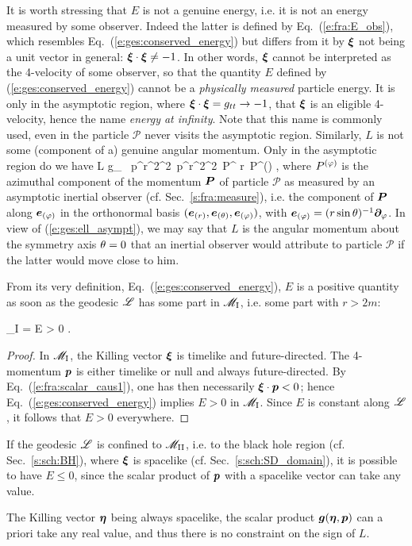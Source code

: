 It is worth stressing that $E$ is not a genuine energy, i.e. it is not
an energy measured by some observer. Indeed the latter is defined by
Eq.~(\ref{e:fra:E_obs}), which resembles Eq.~(\ref{e:ges:conserved_energy})
but differs from it by $\bm{\xi}$ not being a unit vector in general:
$\bm{\xi}\cdot\bm{\xi} \not = -1$. In other words, $\bm{\xi}$ cannot
be interpreted as the 4-velocity of some observer, so that the quantity
$E$ defined by (\ref{e:ges:conserved_energy}) cannot be a \emph{physically measured}
particle energy. It is only in the asymptotic region, where $\bm{\xi}\cdot\bm{\xi} = g_{tt}
\to -1$, that $\bm{\xi}$ is an eligible 4-velocity, hence the name
\emph{energy at infinity}. Note that this name is commonly used, even in the
particle $\mathscr{P}$ never visits the asymptotic region.
Similarly, $L$ is not some (component of a) genuine angular momentum. Only in the
asymptotic region do we have
\be \label{e:ges:ell_asympt}
    L \simeq g_{\ph\ph} \, p^\ph \simeq r^2\sin^2\ph \, p^\ph \simeq r^2\sin^2\theta \, P^\ph
    \simeq r\sin\th \, P^{(\ph)} ,
\ee
where $P^{(\varphi)}$ is the azimuthal component of the momentum $\bm{P}$ of particle $\mathscr{P}$
as measured by an asymptotic inertial observer (cf. Sec.~\ref{s:fra:measure}), i.e.
the component of $\bm{P}$ along $\bm{e}_{(\varphi)}$ in the orthonormal basis $(\bm{e}_{(r)}, \bm{e}_{(\theta)}, \bm{e}_{(\varphi)})$, with $\bm{e}_{(\varphi)} = (r\sin\theta)^{-1} \bm{\partial}_\varphi$.
In view of (\ref{e:ges:ell_asympt}), we may say that $L$ is the angular momentum
about the symmetry axis $\theta=0$ that an inertial observer would attribute to
particle $\mathscr{P}$ if the latter would move close to him.

From its very definition, Eq.~(\ref{e:ges:conserved_energy}), $E$ is
a positive
quantity as soon as the geodesic $\mathscr{L}$ has some part in $\mathscr{M}_{\rm I}$, i.e.
some part with $r>2m$:
\begin{greybox}
\be \label{e:ges:E_positive_M_I}
    \Li \cap \M_{\rm I} \not= \varnothing \quad \Longrightarrow \quad E > 0 .
\ee
\end{greybox}
\begin{proof}
In $\mathscr{M}_{\rm I}$, the Killing vector $\bm{\xi}$ is timelike and future-directed.
The 4-momentum $\bm{p}$ is either timelike or null and always future-directed.
By Eq.~(\ref{e:fra:scalar_caus1}), one has then necessarily $\bm{\xi}\cdot\bm{p} < 0$; hence Eq.~(\ref{e:ges:conserved_energy})
implies $E > 0$ in $\mathscr{M}_{\rm I}$. Since $E$ is constant along $\mathscr{L}$, it
follows that $E > 0$ everywhere.
\end{proof}
\begin{remark}
If the geodesic $\mathscr{L}$ is confined to $\mathscr{M}_{\rm II}$, i.e. to the black hole
region (cf. Sec.~\ref{s:sch:BH}),
where $\bm{\xi}$ is spacelike (cf. Sec.~\ref{s:sch:SD_domain}),
it is possible to have $E \leq 0$, since the
scalar product of $\bm{p}$ with a spacelike vector can take any value.
\end{remark}
\begin{remark}\label{r:ges:L_any_sign}
The Killing vector $\bm{\eta}$ being always spacelike,
the scalar product $\bm{g}(\bm{\eta},\bm{p})$ can a priori take any real value, and
thus there is no constraint
on the sign of $L$.
\end{remark}

